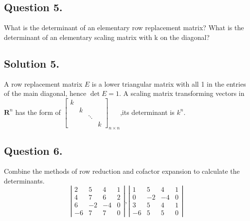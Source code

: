 \documentclass{article}
\begin{document}
\subsection*{Question 5.}
What is the determinant of an elementary row replacement matrix? What is the determinant of an elementary scaling matrix with k on the diagonal?
\subsection*{Solution 5.}
A row replacement matrix $E$ is a lower triangular matrix with all 1 in the entries of the main diagonal, hence $\det{E}=1$.\newline
A scaling matrix transforming vectors in $\mathbf{R}^n$ has the form of $\left[\begin{array}{rrrr}k \\&k\\&&\ddots\\&&&k\end{array}\right]_{n\times n}$,its determinant is $k^n$.
\subsection*{Question 6.}
Combine the methods of row reduction and cofactor expansion to calculate the determinants.
\[\left\vert\begin{array}{rrrr}
2 & 5 & 4 & 1 \\
4 & 7 & 6 & 2 \\
6 & -2 & -4 & 0\\
-6 & 7 & 7 & 0
\end{array}\right\vert,
\left\vert\begin{array}{rrrr}
1 & 5 & 4 & 1 \\
0 & -2 & -4 & 0 \\
3 & 5 & 4 & 1 \\
-6 & 5 & 5 & 0
\end{array}\right\vert\]
\end{document}
